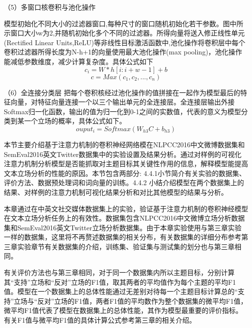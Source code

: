 （5）多窗口核卷积与池化操作

模型初始化不同大小的过滤器窗口,每种尺寸的窗口随机初始化若干参数。图中所示窗口大小w为2,并随机初始化多个不同的过滤器。所得向量将送入修正线性单元(Rectified Linear Units,ReLU)等非线性目标激活函数中,池化操作将卷积层中每个卷积过滤器所得长度为N-h+1的向量使用最大池化操作(max pooling)，池化操作能减低参数维度，减少计算复杂度。具体公式如下
\begin{equation}\label{conv1} c_i=W*h[i:i+w-1]+b \end{equation}
\begin{equation}\label{conv1} c=Max(c_1,c_2,...,c_n) \end{equation}

（6）全连接分类层
把每个卷积核经过池化操作的值拼接在一起作为模型最后的特征向量，对特征向量连接一个以三个输出单元的全连接层。全连接层输出外接Softmax归一化函数，输出的值为归一化到0-1之间的实数值，代表的意义为模型分类到某一个立场的概率，具体公式如下。
\begin{equation}\label{conv1} ouput_i=Softmax(W_{h3}C+b_{h3}) \end{equation}




本节主要介绍基于注意力机制的卷积神经网络模在NLPCC2016中文微博数据集和SemEval2016英文Twitter数据集中的实验设置及结果分析。通过对样例的可视化注意力机制分析模型是否能抓取对主题目标其关键性作用的信息，解释模型能提高文本立场分析的性能的原因。本节包含两部分: 4.4.1小节简介有关实验的数据集、评价方法、数据预处理词和词向量的训练。4.4.2 小结介绍模型在两个数据集上的结果、对样例的注意力机制可视化结果分析和对比其他模型的结果与分析。



本章通过在中英文社交媒体数据集上的实验，验证基于注意力机制的卷积神经模型在文本立场分析任务上的有效性。数据集包含NLPCC2016中文微博立场分析数据集和SemEval2016英文Twitter立场分析数据集。由于本章实验使用与第三章实验一样的数据集，这里将不再赘述数据集的相关分布，有关数据集的详细分布参考第三章实验章节有关数据集的介绍，训练集、验证集与测试集的划分也与第三章相同。

有关评价方法也与第三章相同，对于同一个数据集内所以主题目标，分别计算其“支持”立场和“反对”立场的F1值，取其两者的平均值作为每个主题的平均F1值。模型在一个数据集上的总体性能通过无差别对待每一个主题目标计算总的“支持”立场与“反对”立场的F1值，两者F1值的平均数作为整个数据集的微平均F1值，微平均F1值代表了模型在数据集上的总体性能，其作为模型最重要的评价指标。有关F1值与微平均F1值的具体计算公式参考第三章的相关介绍。

